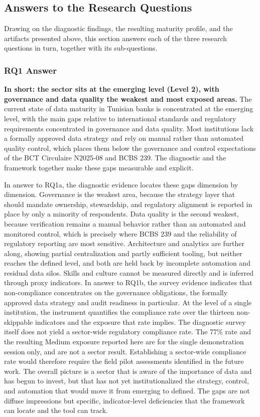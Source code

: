 \subsection{Answers to the Research Questions}

Drawing on the diagnostic findings, the resulting maturity profile, and the artifacts presented above, this section answers each of the three research questions in turn, together with its sub-questions.

\subsubsection{RQ1 Answer}

\textbf{In short: the sector sits at the emerging level (Level 2), with governance and data quality the weakest and most exposed areas.} The current state of data maturity in Tunisian banks is concentrated at the emerging level, with the main gaps relative to international standards and regulatory requirements concentrated in governance and data quality. Most institutions lack a formally approved data strategy and rely on manual rather than automated quality control, which places them below the governance and control expectations of the BCT Circulaire N\textdegree{}2025-08 and BCBS 239. The diagnostic and the framework together make these gaps measurable and explicit.

In answer to RQ1a, the diagnostic evidence locates these gaps dimension by dimension. Governance is the weakest area, because the strategy layer that should mandate ownership, stewardship, and regulatory alignment is reported in place by only a minority of respondents. Data quality is the second weakest, because verification remains a manual behavior rather than an automated and monitored control, which is precisely where BCBS 239 and the reliability of regulatory reporting are most sensitive. Architecture and analytics are further along, showing partial centralization and partly sufficient tooling, but neither reaches the defined level, and both are held back by incomplete automation and residual data silos. Skills and culture cannot be measured directly and is inferred through proxy indicators. In answer to RQ1b, the survey evidence indicates that non-compliance concentrates on the governance obligations, the formally approved data strategy and audit readiness in particular. At the level of a single institution, the instrument quantifies the compliance rate over the thirteen non-skippable indicators and the exposure that rate implies. The diagnostic survey itself does not yield a sector-wide regulatory compliance rate. The 77\% rate and the resulting Medium exposure reported here are for the single demonstration session only, and are not a sector result. Establishing a sector-wide compliance rate would therefore require the field pilot assessments identified in the future work. The overall picture is a sector that is aware of the importance of data and has begun to invest, but that has not yet institutionalized the strategy, control, and automation that would move it from emerging to defined. The gaps are not diffuse impressions but specific, indicator-level deficiencies that the framework can locate and the tool can track.

